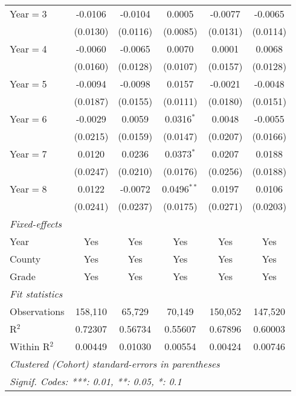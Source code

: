 \begin{table}[htbp]
\begin{tabular}{lccccc}
      Year$=$3             & -0.0106        & -0.0104         & 0.0005          & -0.0077  & -0.0065\\
                           & (0.0130)       & (0.0116)        & (0.0085)        & (0.0131) & (0.0114)\\
      Year$=$4             & -0.0060        & -0.0065         & 0.0070          & 0.0001   & 0.0068\\
                           & (0.0160)       & (0.0128)        & (0.0107)        & (0.0157) & (0.0128)\\
      Year$=$5             & -0.0094        & -0.0098         & 0.0157          & -0.0021  & -0.0048\\
                           & (0.0187)       & (0.0155)        & (0.0111)        & (0.0180) & (0.0151)\\
      Year$=$6             & -0.0029        & 0.0059          & 0.0316$^{*}$    & 0.0048   & -0.0055\\
                           & (0.0215)       & (0.0159)        & (0.0147)        & (0.0207) & (0.0166)\\
      Year$=$7             & 0.0120         & 0.0236          & 0.0373$^{*}$    & 0.0207   & 0.0188\\
                           & (0.0247)       & (0.0210)        & (0.0176)        & (0.0256) & (0.0188)\\
      Year$=$8             & 0.0122         & -0.0072         & 0.0496$^{**}$   & 0.0197   & 0.0106\\
                           & (0.0241)       & (0.0237)        & (0.0175)        & (0.0271) & (0.0203)\\
      \midrule \emph{Fixed-effects} &   &   &   &   &  \\
      Year                 & Yes            & Yes             & Yes             & Yes      & Yes\\
      County               & Yes            & Yes             & Yes             & Yes      & Yes\\
      Grade                & Yes            & Yes             & Yes             & Yes      & Yes\\
      \midrule \emph{Fit statistics} &   &   &   &   &  \\
      Observations         & 158,110        & 65,729          & 70,149          & 150,052  & 147,520\\
      R$^2$                & 0.72307        & 0.56734         & 0.55607         & 0.67896  & 0.60003\\
      Within R$^2$         & 0.00449        & 0.01030         & 0.00554         & 0.00424  & 0.00746\\
      \midrule\midrule\multicolumn{6}{l}{\emph{Clustered (Cohort) standard-errors in parentheses}}\\
      \multicolumn{6}{l}{\emph{Signif. Codes: ***: 0.01, **: 0.05, *: 0.1}}\\
   \end{tabular}
\end{table}


